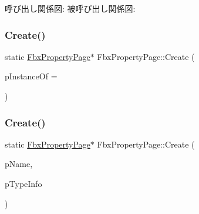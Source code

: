 呼び出し関係図\+:
被呼び出し関係図\+:
\mbox{\label{class_fbx_property_page_ad7b37984a6215b974a58652ac43ffdf9}} 
\subsubsection{\texorpdfstring{Create()}{Create()}\hspace{0.1cm}{\footnotesize\ttfamily [1/3]}}
{\footnotesize\ttfamily static \hyperlink{class_fbx_property_page}{Fbx\+Property\+Page}$\ast$ Fbx\+Property\+Page\+::\+Create (\begin{DoxyParamCaption}\item[{\hyperlink{class_fbx_property_page}{Fbx\+Property\+Page} $\ast$}]{p\+Instance\+Of = {} }\end{DoxyParamCaption})\hspace{0.3cm}{\ttfamily [static]}}

\mbox{\label{class_fbx_property_page_a5b414e6abd7247932caeaf61c7446834}} 
\subsubsection{\texorpdfstring{Create()}{Create()}\hspace{0.1cm}{\footnotesize\ttfamily [2/3]}}
{\footnotesize\ttfamily static \hyperlink{class_fbx_property_page}{Fbx\+Property\+Page}$\ast$ Fbx\+Property\+Page\+::\+Create (\begin{DoxyParamCaption}\item[{const char $\ast$}]{p\+Name,  }\item[{\hyperlink{class_fbx_property_page}{Fbx\+Property\+Page} $\ast$}]{p\+Type\+Info }\end{DoxyParamCaption})\hspace{0.3cm}{\ttfamily [static]}}

\mbox{\label{class_fbx_property_page_af9d499eed8ef1bf4ad130d5d2e05ff8f}} 
